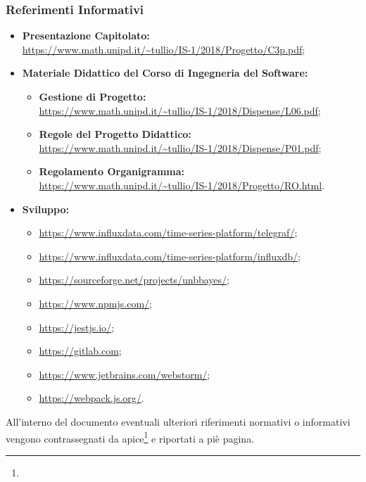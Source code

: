 \subsubsection{Referimenti Informativi}
\begin{itemize}
\item \textbf{Presentazione Capitolato:}\\ \url{https://www.math.unipd.it/~tullio/IS-1/2018/Progetto/C3p.pdf};
\item \textbf{Materiale Didattico del Corso di Ingegneria del Software:}
	\begin{itemize}
	\item \textbf{Gestione di Progetto:}\\ \url{https://www.math.unipd.it/~tullio/IS-1/2018/Dispense/L06.pdf};
	\item \textbf{Regole del Progetto Didattico:}\\ \url{https://www.math.unipd.it/~tullio/IS-1/2018/Dispense/P01.pdf};
	\item \textbf{Regolamento Organigramma:}\\ \url{https://www.math.unipd.it/~tullio/IS-1/2018/Progetto/RO.html}.
	\end{itemize}
\item \textbf{Sviluppo:}
	\begin{itemize}
	\item \url{https://www.influxdata.com/time-series-platform/telegraf/};
	\item \url{https://www.influxdata.com/time-series-platform/influxdb/};
	\item \url{https://sourceforge.net/projects/unbbayes/};
	\item \url{https://www.npmjs.com/};
	\item \url{https://jestjs.io/};
	\item \url{https://gitlab.com};
	\item \url{https://www.jetbrains.com/webstorm/};
	\item \url{https://webpack.js.org/}.
	\end{itemize}
\end{itemize}

All'interno del documento eventuali ulteriori riferimenti normativi o informativi vengono contrassegnati da apice\footnote{} e riportati a piè pagina.